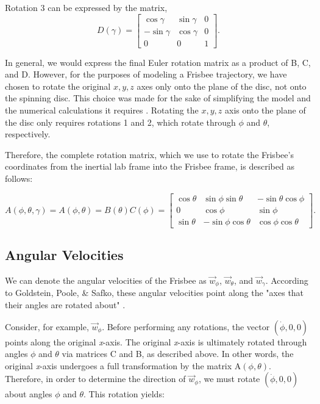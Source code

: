 \documentclass[a4paper,12pt, oneside]{article}
\begin{document}
Rotation 3 can be expressed by the matrix, 
\begin{equation*}
D(\gamma)=\begin{bmatrix}
\cos\gamma & \sin\gamma & 0 \\
-\sin\gamma & \cos\gamma & 0 \\
0 & 0 & 1
\end{bmatrix}.
\end{equation*}

In general, we would express the final Euler rotation matrix as a product of B, C, and D. However, for the purposes of modeling a Frisbee trajectory, we have chosen to rotate the original $x, y, z$ axes only onto the plane of the disc, not onto the spinning disc. This choice was made for the sake of simplifying the model and the numerical calculations it requires \cite{H3}. Rotating the $x, y, z$ axis onto the plane of the disc only requires rotations 1 and 2, which rotate through $\phi$ and $\theta$, respectively.

Therefore, the complete rotation matrix, which we use to rotate the Frisbee's coordinates from the inertial lab frame into the Frisbee frame, is described as follows:

\begin{equation*}
A(\phi,\theta,\gamma)=A(\phi,\theta)=B(\theta)C(\phi)=\begin{bmatrix}
\cos\theta & \sin\phi\sin\theta & -\sin\theta\cos\phi \\
0 & \cos\phi & \sin\phi \\
\sin\theta & -\sin\phi\cos\theta & \cos\phi\cos\theta
\end{bmatrix}.
\end{equation*}

\subsection{Angular Velocities}

We can denote the angular velocities of the Frisbee as $\vec{w}_\phi$, $\vec{w}_\theta$, and $\vec{w}_\gamma$.  According to Goldstein, Poole, \& Safko, these angular velocities point along the "axes that their angles are rotated about" \cite{gps}.

Consider, for example, $\vec{w}_\phi$.  Before performing any rotations, the vector $(\dot\phi, 0, 0)$ points along the original \textit{x}-axis.  The original \textit{x}-axis is ultimately rotated through angles $\phi$ and $\theta$ via matrices C and B, as described above. In other words, the original \textit{x}-axis undergoes a full transformation by the matrix A$(\phi,\theta)$. Therefore, in order to determine the direction of $\vec{w}_\phi$, we must rotate $(\dot\phi, 0, 0)$ about angles $\phi$ and $\theta$.  This rotation yields:
\end{document}
